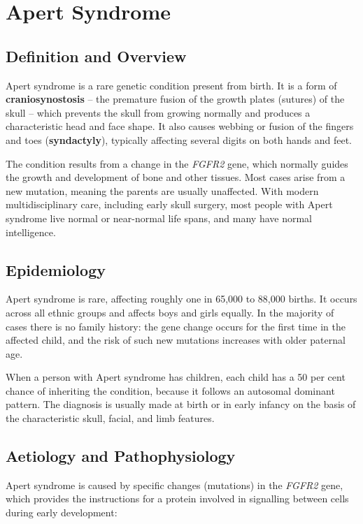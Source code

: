 \chapter{Apert Syndrome}

\section*{Definition and Overview}
Apert syndrome is a rare genetic condition present from birth. It is a form of \textbf{craniosynostosis} -- the premature fusion of the growth plates (sutures) of the skull -- which prevents the skull from growing normally and produces a characteristic head and face shape. It also causes webbing or fusion of the fingers and toes (\textbf{syndactyly}), typically affecting several digits on both hands and feet.

The condition results from a change in the \textit{FGFR2} gene, which normally guides the growth and development of bone and other tissues. Most cases arise from a new mutation, meaning the parents are usually unaffected. With modern multidisciplinary care, including early skull surgery, most people with Apert syndrome live normal or near-normal life spans, and many have normal intelligence.

\section*{Epidemiology}
Apert syndrome is rare, affecting roughly one in 65,000 to 88,000 births. It occurs across all ethnic groups and affects boys and girls equally. In the majority of cases there is no family history: the gene change occurs for the first time in the affected child, and the risk of such new mutations increases with older paternal age.

When a person with Apert syndrome has children, each child has a 50 per cent chance of inheriting the condition, because it follows an autosomal dominant pattern. The diagnosis is usually made at birth or in early infancy on the basis of the characteristic skull, facial, and limb features.

\section*{Aetiology and Pathophysiology}
Apert syndrome is caused by specific changes (mutations) in the \textit{FGFR2} gene, which provides the instructions for a protein involved in signalling between cells during early development:


